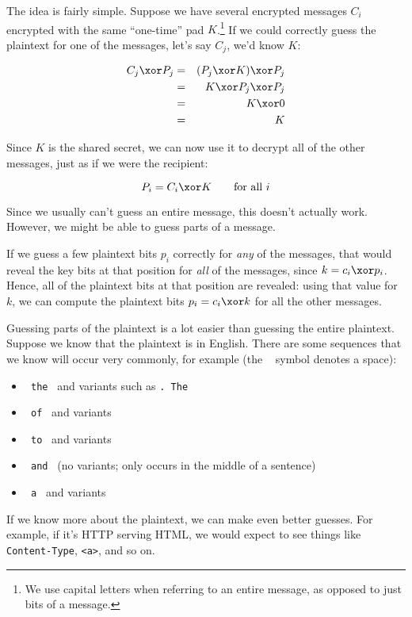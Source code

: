 \documentclass[11pt,ebook,table,dvipsnames]{memoir}
\begin{document}
The idea is fairly simple. Suppose we have several encrypted messages
$C_i$ encrypted with the same \enquote{one-time} pad $K$.\footnote{We use capital
letters when referring to an entire message, as opposed to just bits
of a message.} If we could correctly guess the plaintext for one of
the messages, let's say $C_j$, we'd know $K$:

\begin{eqnarray*}
C_j \xor P_j
&=& (P_j \xor K) \xor P_j \\
&=& K \xor P_j \xor P_j \\
&=& K \xor 0 \\
&=& K
\end{eqnarray*}

Since $K$ is the shared secret, we can now use it to decrypt all of
the other messages, just as if we were the recipient:

\[
P_i = C_i \xor K \qquad \text{for all }i
\]

Since we usually can't guess an entire message, this doesn't actually
work. However, we might be able to guess parts of a message.

If we guess a few plaintext bits $p_i$ correctly for \emph{any} of the
messages, that would reveal the key bits at that position for \emph{all} of
the messages, since $k = c_i \xor p_i$. Hence, all of the plaintext
bits at that position are revealed: using that value for $k$, we can
compute the plaintext bits $p_i = c_i \xor k$ for all the other
messages.

Guessing parts of the plaintext is a lot easier than guessing the
entire plaintext. Suppose we know that the plaintext is in English.
There are some sequences that we know will occur very commonly, for
example (the \verb*| | symbol denotes a space):

\begin{itemize}
\item \verb*| the | and variants such as \verb*|. The |
\item \verb*| of | and variants
\item \verb*| to | and variants
\item \verb*| and | (no variants; only occurs in the middle of a sentence)
\item \verb*| a | and variants
\end{itemize}

If we know more about the plaintext, we can make even better guesses.
For example, if it's HTTP serving HTML, we would expect to see things
like \texttt{Content-Type}, \texttt{<a>}, and so on.
\end{document}
